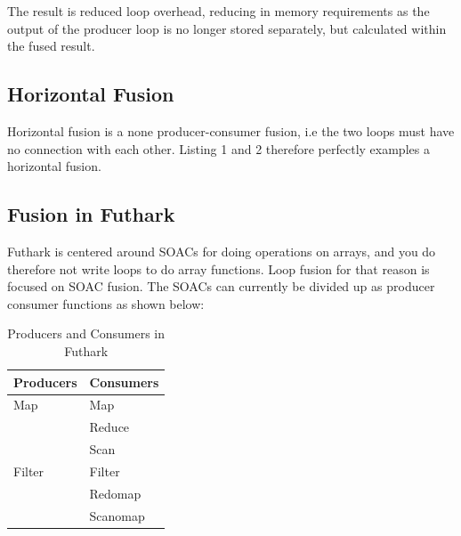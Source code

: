 \documentclass[11pt]{article}
\begin{document}
The result is reduced loop overhead, reducing in memory requirements as the output of the producer loop is no longer stored separately, but calculated within the fused result.

\subsection{Horizontal Fusion}
Horizontal fusion is a none producer-consumer fusion, i.e the two loops must have no connection with each other. Listing 1 and 2 therefore perfectly examples a horizontal fusion.  
\subsection{Fusion in Futhark}
Futhark is centered around SOACs for doing operations on arrays, and you do therefore not write loops to do array functions. Loop fusion for that reason is focused on SOAC fusion. The SOACs can currently be divided up as producer consumer functions as shown below:

\begin{table}[hb!]
\centering
\caption{Producers and Consumers in Futhark}
\label{my-label}
\begin{tabular}{|l|l|}
\hline
\textbf{Producers} & \textbf{Consumers} \\ \hline
Map                & Map                \\ \hline
                   & Reduce             \\ \hline
                   & Scan               \\ \hline
Filter             & Filter             \\ \hline
                   & Redomap            \\ \hline
                   & Scanomap           \\ \hline
\end{tabular}
\end{table}
\end{document}
